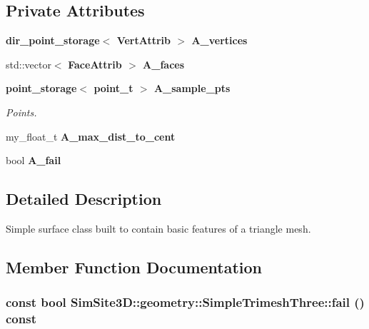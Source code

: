 \subsection*{Private Attributes}
\begin{CompactItemize}
\item 
\bf{dir\_\-point\_\-storage}$<$ \bf{Vert\-Attrib} $>$ \textbf{A\_\-vertices}\label{classSimSite3D_1_1geometry_1_1SimpleTrimeshThree_f8f2de92be2e2a5891d86f1a048869e2}

\item 
std::vector$<$ \bf{Face\-Attrib} $>$ \textbf{A\_\-faces}\label{classSimSite3D_1_1geometry_1_1SimpleTrimeshThree_f5848e48e7d8ca9a90f658906b2fdbbb}

\item 
\bf{point\_\-storage}$<$ \bf{point\_\-t} $>$ \bf{A\_\-sample\_\-pts}\label{classSimSite3D_1_1geometry_1_1SimpleTrimeshThree_17dfc1cc8ca141a236a54665b14c43eb}

\begin{CompactList}\small\item\em Points. \item\end{CompactList}\item 
my\_\-float\_\-t \textbf{A\_\-max\_\-dist\_\-to\_\-cent}\label{classSimSite3D_1_1geometry_1_1SimpleTrimeshThree_5ca5a91997f308b970217f23fa51401c}

\item 
bool \textbf{A\_\-fail}\label{classSimSite3D_1_1geometry_1_1SimpleTrimeshThree_773f3c715fcc91004e1fe529c0c79be2}

\end{CompactItemize}


\subsection{Detailed Description}
Simple surface class built to contain basic features of a triangle mesh. 



\subsection{Member Function Documentation}
\subsubsection{\setlength{\rightskip}{0pt plus 5cm}const bool SimSite3D::geometry::Simple\-Trimesh\-Three::fail () const\hspace{0.3cm}{\tt  [inline]}}\label{classSimSite3D_1_1geometry_1_1SimpleTrimeshThree_2e9bb6efe1d7ed203ac88caa6a1e0b96}


